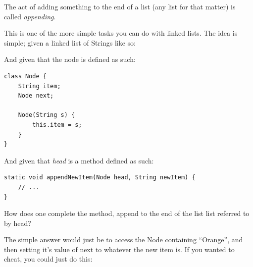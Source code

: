 \documentclass[./main.tex]{subfiles}
\begin{document}
\begin{importantbox}
The act of adding something to the end of a list (any list for that matter) is called \emph{appending}.
\end{importantbox}

This is one of the more simple tasks you can do with linked lists. The idea is simple; given a linked list of
{\mono String}s like so:

\begin{figure}[htbp]
    \centering
\end{figure}

And given that the node is defined as such:

\begin{verbatim}
class Node {
    String item;
    Node next;

    Node(String s) {
        this.item = s;
    }
}
\end{verbatim}

And given that \emph{head} is a method defined as such:

\begin{verbatim}
static void appendNewItem(Node head, String newItem) {
    // ...
}
\end{verbatim}

How does one complete the method, append to the end of the list list referred to by head?

The simple answer would just be to access the Node containing ``Orange'', and then setting it's value
of {\mono next} to whatever the new item is. If you wanted to cheat, you could just do this:
\end{document}
